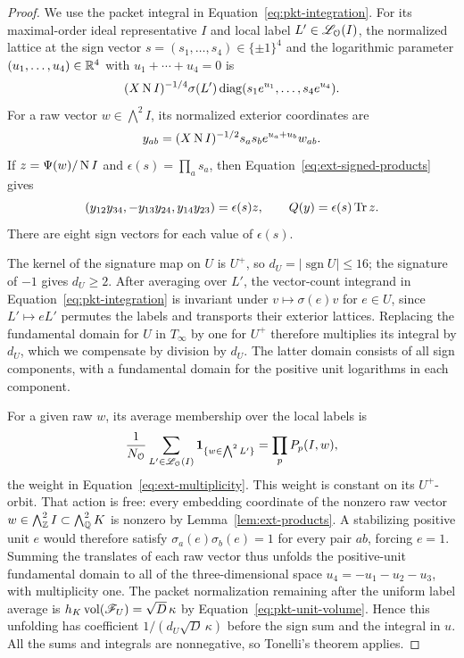 \begin{proof}
We use the packet integral in Equation~\eqref{eq:pkt-integration}.
For its maximal-order ideal representative $I$ and local label
$L'\in\mathscr L_{\mathcal O}(I)$, the normalized lattice at the sign vector
$s=(s_1,\ldots,s_4)\in\{\pm1\}^4$ and the logarithmic parameter
$(u_1,\ldots,u_4)\in\mathbb R^4$ with $u_1+\cdots+u_4=0$ is
\[
 (X\operatorname{N} I)^{-1/4}\sigma(L')
       \operatorname{diag}(s_1e^{u_1},\ldots,s_4e^{u_4}).
\]
For a raw vector $w\in\bigwedge^2 I$, its normalized exterior coordinates
are
\[
 y_{ab}=(X\operatorname{N} I)^{-1/2}s_as_b e^{u_a+u_b}w_{ab}.
\]
If $z=\Psi(w)/\operatorname{N} I$ and $\epsilon(s)=\prod_a s_a$, then
Equation~\eqref{eq:ext-signed-products} gives
\begin{equation}\label{eq:end-signed-products}
 (y_{12}y_{34},-y_{13}y_{24},y_{14}y_{23})
       =\epsilon(s)z,\qquad
 Q(y)=\epsilon(s)\operatorname{Tr} z.
\end{equation}
There are eight sign vectors for each value of $\epsilon(s)$.

The kernel of the signature map on $U$ is $U^+$, so
$d_U=|\operatorname{sgn}U|\le16$; the signature of $-1$ gives
$d_U\ge2$.  After averaging over $L'$, the vector-count integrand in
Equation~\eqref{eq:pkt-integration} is invariant under
$v\mapsto\sigma(e)v$ for $e\in U$, since $L'\mapsto eL'$ permutes the
labels and transports their exterior lattices.  Replacing
the fundamental domain for $U$ in $T_\infty$ by one for $U^+$ therefore
multiplies its integral by $d_U$, which we compensate by division by
$d_U$.  The latter domain consists of all sign components, with a
fundamental domain for the positive unit logarithms in each component.

For a given raw $w$, its average membership over the local labels is
\[
 \frac1{N_{\mathcal O}}\sum_{L'\in\mathscr L_{\mathcal O}(I)}
       \mathbf 1_{\{w\in\bigwedge^2L'\}}
     =\prod_p P_p(I,w),
\]
the weight in Equation~\eqref{eq:ext-multiplicity}.  This weight is constant on its
$U^+$-orbit.  That action is free: every embedding coordinate of the
nonzero raw vector $w\in\bigwedge^2_{\mathbb Z}I\subset\bigwedge^2_{\mathbb Q}K$ is
nonzero by Lemma~\ref{lem:ext-products}.  A stabilizing positive unit
$e$ would therefore satisfy $\sigma_a(e)\sigma_b(e)=1$ for every pair
$ab$, forcing $e=1$.  Summing the translates of each raw vector thus unfolds the
positive-unit fundamental domain to all of the three-dimensional space
$u_4=-u_1-u_2-u_3$, with multiplicity one.  The packet normalization
remaining after the uniform label average is
$h_K\operatorname{vol}(\mathscr F_U)=\sqrt D\,\kappa$ by
Equation~\eqref{eq:pkt-unit-volume}.  Hence this unfolding has coefficient
$1/(d_U\sqrt D\,\kappa)$ before the sign sum and the integral in $u$.
All the sums and integrals are nonnegative, so Tonelli's theorem applies.


\end{proof}
